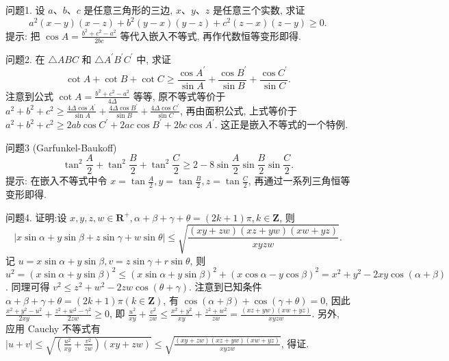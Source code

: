 
问题1. 设 $a 、 b 、 c$ 是任意三角形的三边, $x 、 y 、 z$ 是任意三个实数, 求证
$$
a^2(x-y)(x-z)+b^2(y-x)(y-z)+c^2(z-x)(z-y) \geqslant 0 .
$$
提示: 把 $\cos A=\frac{b^2+c^2-a^2}{2 b c}$ 等代入嵌入不等式, 再作代数恒等变形即得.



问题2. 在 $\triangle A B C$ 和 $\triangle A^{\prime} B^{\prime} C^{\prime}$ 中, 求证
$$
\cot A+\cot B+\cot C \geqslant \frac{\cos A^{\prime}}{\sin A}+\frac{\cos B^{\prime}}{\sin B}+\frac{\cos C^{\prime}}{\sin C} .
$$
注意到公式 $\cot A=\frac{b^2+c^2-a^2}{4 \Delta}$ 等等, 原不等式等价于 $a^2+b^2+c^2 \geqslant \frac{4 \Delta \cos A^{\prime}}{\sin A}+\frac{4 \Delta \cos B^{\prime}}{\sin B}+\frac{4 \Delta \cos C^{\prime}}{\sin C}$, 再由面积公式, 上式等价于 $a^2+b^2+c^2 \geqslant 2 a b \cos C^{\prime}+2 a c \cos B^{\prime}+2 b c \cos A^{\prime}$. 这正是嵌入不等式的一个特例.



问题3 (Garfunkel-Baukoff)
$$
\tan ^2 \frac{A}{2}+\tan ^2 \frac{B}{2}+\tan ^2 \frac{C}{2} \geqslant 2-8 \sin \frac{A}{2} \sin \frac{B}{2} \sin \frac{C}{2} .
$$
提示: 在嵌入不等式中令 $x=\tan \frac{A}{2}, y=\tan \frac{B}{2}, z=\tan \frac{C}{2}$, 再通过一系列三角恒等变形即得.



问题4. 证明:设 $x, y, z, w \in \mathbf{R}^{+}, \alpha+\beta+\gamma+\theta=(2 k+1) \pi, k \in \mathbf{Z}$, 则
$$
|x \sin \alpha+y \sin \beta+z \sin \gamma+w \sin \theta| \leqslant \sqrt{\frac{(x y+z w)(x z+y w)(x w+y z)}{x y z w}} .
$$
记 $u=x \sin \alpha+y \sin \beta, v=z \sin \gamma+r \sin \theta$, 则 $u^2=(x \sin \alpha+y \sin \beta)^2 \leqslant (x \sin \alpha+y \sin \beta)^2+(x \cos \alpha-y \cos \beta)^2=x^2+y^2-2 x y \cos (\alpha+\beta)$. 同理可得 $v^2 \leqslant z^2+w^2-2 z w \cos (\theta+\gamma)$. 注意到已知条件 $\alpha+\beta+\gamma+\theta=(2 k+1) \pi (k \in \mathbf{Z})$, 有 $\cos (\alpha+\beta)+\cos (\gamma+\theta)=0$, 因此 $\frac{x^2+y^2-u^2}{2 x y}+\frac{z^2+w^2-\gamma^2}{2 z w} \geqslant 0$, 即 $\frac{u^2}{x y}+\frac{v^2}{z w} \leqslant \frac{x^2+y^2}{x y}+\frac{z^2+w^2}{z w}=\frac{(x z+y w)(x w+y z)}{x y z w}$. 另外, 应用 Cauchy 不等式有 $|u+v| \leqslant \sqrt{\left(\frac{u^2}{x y}+\frac{v^2}{z w}\right)(x y+z w)} \leqslant \sqrt{\frac{(x y+z w)(x z+y w)(x w+y z)}{x y z w}}$, 得证.



